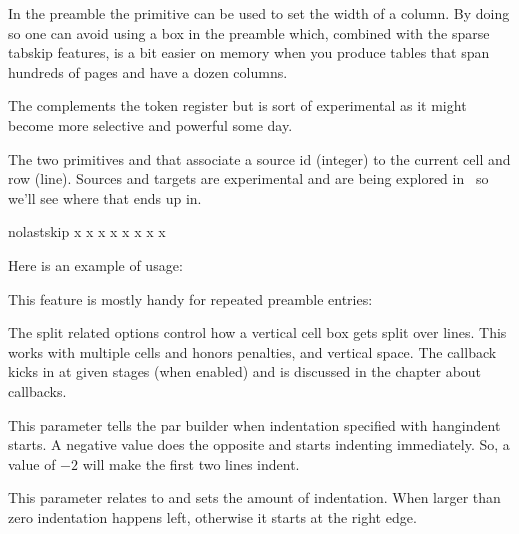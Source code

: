 In the preamble the  primitive can be used to set the width of a
column. By doing so one can avoid using a box in the preamble which, combined
with the sparse tabskip features, is a bit easier on memory when you produce
tables that span hundreds of pages and have a dozen columns.

The  complements the  token register but is sort of
experimental as it might become more selective and powerful some day.

The two primitives  and  that
associate a source id (integer) to the current cell and row (line). Sources and
targets are experimental and are being explored in \CONTEXT\ so we'll see where
that ends up in.

\startbuffer
{}

\halign nolastskip {
    \aligncontent \aligntab
    \aligncontent \aligntab \aligntab
    \aligncontent \cr
    x \aligntab x \aligntab x \aligntab x\cr
    x \aligntab x \aligntab x \aligntab x\cr
}
\stopbuffer

Here is an example of  usage:

\typebuffer[option=TEX]

This feature is mostly handy for repeated preamble entries:

{\showboxes \getbuffer}

The split related options control how a vertical cell box gets split over lines.
This works with multiple cells and honors penalties, and vertical space. The
callback kicks in at given stages (when enabled) and is discussed in the chapter
about callbacks.

\stopoldprimitive

\startoldprimitive[title={\prm {hangafter}}]

This parameter tells the par builder when indentation specified with \prm
{hangindent} starts. A negative value does the opposite and starts indenting
immediately. So, a value of $-2$ will make the first two lines indent.

\stopoldprimitive

\startoldprimitive[title={\prm {hangindent}}]

This parameter relates to  and sets the amount of indentation.
When larger than zero indentation happens left, otherwise it starts at the right
edge.

